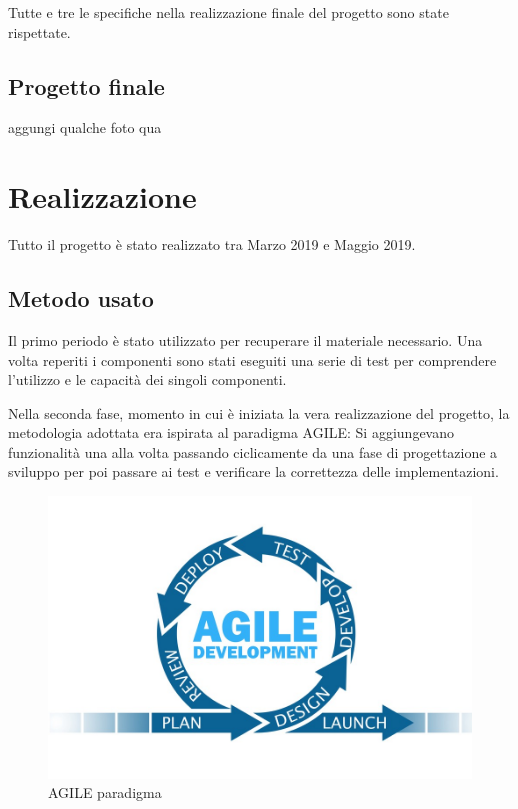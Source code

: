 \documentclass[paper=a4, fontsize=10pt]{scrartcl}
\begin{document}
Tutte e tre le specifiche nella realizzazione finale del progetto sono state rispettate.

\subsection{Progetto finale}
aggungi qualche foto qua



\section{Realizzazione}
Tutto il progetto è stato realizzato tra Marzo 2019 e Maggio 2019.\\

\subsection{Metodo usato}
Il primo periodo è stato utilizzato per recuperare il materiale necessario. Una volta reperiti i componenti sono stati eseguiti una serie di test per comprendere l'utilizzo e le capacità dei singoli componenti.

Nella seconda fase, momento in cui è iniziata la vera realizzazione del progetto, la metodologia adottata era ispirata al paradigma AGILE: Si aggiungevano funzionalità una alla volta passando ciclicamente da una fase di progettazione a sviluppo per poi passare ai test e verificare la correttezza delle implementazioni.

\begin{figure}
  \includegraphics[width=\linewidth]{AGILE.jpeg}
  \caption{AGILE paradigma}
  \label{fig:agile1}
\end{figure}
    
\end{document}
